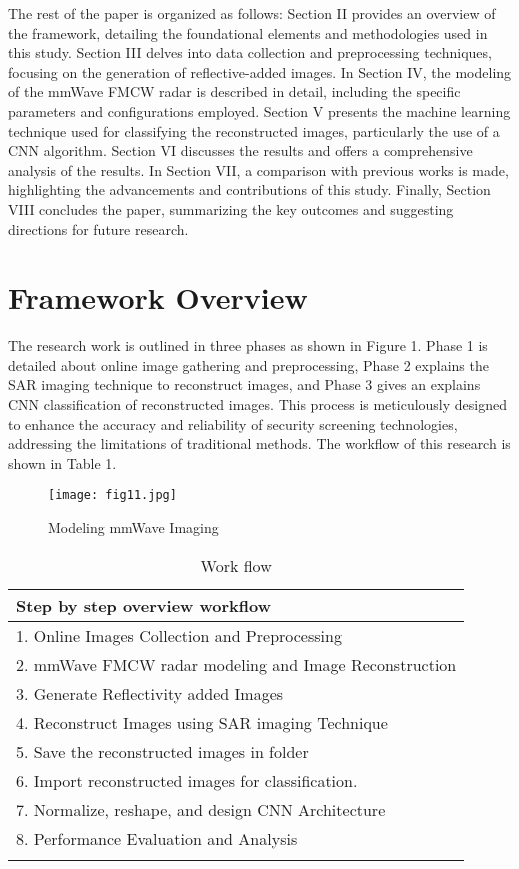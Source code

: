\documentclass[journal,article,submit,pdftex,moreauthors]{Definitions/mdpi}
\begin{document}
The rest of the paper is organized as follows: Section II provides an overview of the framework, detailing the foundational elements and methodologies used in this study. Section III delves into data collection and preprocessing techniques, focusing on the generation of reflective-added images. In Section IV, the modeling of the mmWave FMCW radar is described in detail, including the specific parameters and configurations employed. Section V presents the machine learning technique used for classifying the reconstructed images, particularly the use of a CNN algorithm. Section VI discusses the results and offers a comprehensive analysis of the results. In Section VII, a comparison with previous works is made, highlighting the advancements and contributions of this study. Finally, Section VIII concludes the paper, summarizing the key outcomes and suggesting directions for future research.



\section{Framework Overview}
The research work is outlined in three phases as shown in Figure 1.  Phase 1 is detailed about online image gathering and preprocessing, Phase 2 explains the SAR imaging technique to reconstruct images, and Phase 3 gives an explains CNN classification of reconstructed images.  This process is meticulously designed to enhance the accuracy and reliability of security screening technologies, addressing the limitations of traditional methods. The workflow of this research is shown in Table 1.

\begin{figure}[h]
  \centering
 \texttt{[image: fig11.jpg]}
  \caption{Modeling mmWave Imaging}
  \label{Figure:}
\end{figure}


\begin{table}[h]
\centering
\caption{Work flow}
\label{tab:mmWave FMCW_Spec}
\begin{tabular}{l}
\hline
\textbf{Step by step overview workflow}  \\ \hline
    1. Online Images Collection and Preprocessing  \\
    2. mmWave FMCW radar modeling and Image Reconstruction\\
    3. Generate Reflectivity added Images\\
    4. Reconstruct Images using SAR imaging Technique \\
    5. Save the reconstructed images in folder\\
    6. Import reconstructed images for classification. \\ 
    7. Normalize, reshape, and design CNN Architecture\\
    8. Performance Evaluation and Analysis\\
    \hline\\
    \end{tabular}
\end{table}
\end{document}
